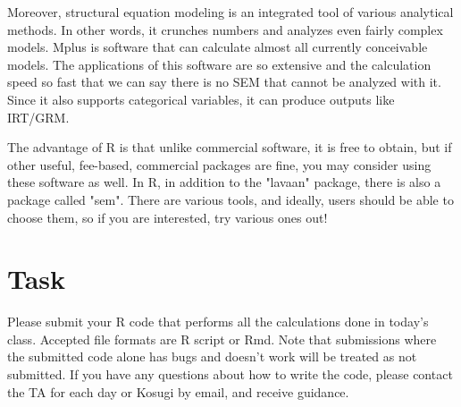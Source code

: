 \documentclass{ltjsbook}
\begin{document}
Moreover, structural equation modeling is an integrated tool of various analytical methods. In other words, it crunches numbers and analyzes even fairly complex models. Mplus is software that can calculate almost all currently conceivable models. The applications of this software are so extensive and the calculation speed so fast that we can say there is no SEM that cannot be analyzed with it. Since it also supports categorical variables, it can produce outputs like IRT/GRM.

The advantage of R is that unlike commercial software, it is free to obtain, but if other useful, fee-based, commercial packages are fine, you may consider using these software as well. In R, in addition to the "lavaan" package, there is also a package called "sem". There are various tools, and ideally, users should be able to choose them, so if you are interested, try various ones out!

\section{Task}
Please submit your R code that performs all the calculations done in today's class. Accepted file formats are R script or Rmd. Note that submissions where the submitted code alone has bugs and doesn't work will be treated as not submitted. If you have any questions about how to write the code, please contact the TA for each day or Kosugi by email, and receive guidance.
\end{document}
